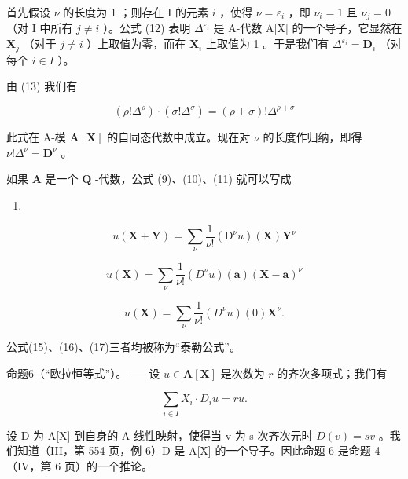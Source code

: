 首先假设 \(\nu\) 的长度为 1 ；则存在 I 的元素 \(i\) ，使得 \(\nu = \varepsilon_i\) ，即 \(\nu_i = 1\) 且 \(\nu_j = 0\) （对 I 中所有 \(j \neq i\) ）。公式 (12) 表明 \(\Delta^{\varepsilon_i}\) 是 A-代数 A{[}X{]} 的一个导子，它显然在 \(\mathbf{X}_j\) （对于 \(j \neq i\) ）上取值为零，而在 \(\mathbf{X}_i\) 上取值为 1 。于是我们有 \(\Delta^{\varepsilon_i} = \mathbf{D}_i\) （对每个 \(i \in I\) ）。

由 (13) 我们有

\[
(\rho ! \Delta^ {\rho}) \cdot (\sigma ! \Delta^ {\sigma}) = (\rho + \sigma)! \Delta^ {\rho + \sigma}\tag{14}
\]

此式在 A-模 \(\mathbf{A}[\mathbf{X}]\) 的自同态代数中成立。现在对 \(\nu\) 的长度作归纳，即得 \(\nu! \Delta^{\nu} = \mathbf{D}^{\nu}\) 。

如果 \(\mathbf{A}\) 是一个 \(\mathbf{Q}\) -代数，公式 (9)、(10)、(11) 就可以写成

\begin{enumerate}
\def\labelenumi{(\arabic{enumi})}
\setcounter{enumi}{14}
\tightlist
\item
\end{enumerate}

\[
u (\mathbf {X} + \mathbf {Y}) = \sum_ {\nu} \frac {1}{\nu !} (\mathrm{D} ^ {\nu} u) (\mathbf {X}) \mathbf {Y} ^ {\nu}
\]

\[
u (\mathbf {X}) = \sum_ {\nu} \frac {1}{\nu !} (D ^ {\nu} u) (\mathbf {a}) (\mathbf {X} - \mathbf {a}) ^ {\nu}\tag{16}
\]

\[
u (\mathbf {X}) = \sum_ {\nu} \frac {1}{\nu !} (D ^ {\nu} u) (0) \mathbf {X} ^ {\nu}.\tag{17}
\]

公式(15)、(16)、(17)三者均被称为“泰勒公式”。

命题6（“欧拉恒等式”）。——设 \(u \in \mathbf{A}[\mathbf{X}]\) 是次数为 \(r\) 的齐次多项式；我们有

\[
\sum_ {i \in I} X _ {i} \cdot D _ {i} u = r u.
\]

设 D 为 A{[}X{]} 到自身的 A-线性映射，使得当 v 为 s 次齐次元时 \(D(v) = sv\) 。我们知道（III，第 554 页，例 6）D 是 A{[}X{]} 的一个导子。因此命题 6 是命题 4（IV，第 6 页）的一个推论。

